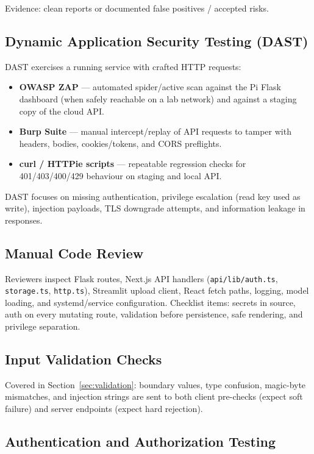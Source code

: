 \documentclass[12pt]{article}
\begin{document}
Evidence: clean reports or documented false positives / accepted risks.

\subsection{Dynamic Application Security Testing (DAST)}

DAST exercises a running service with crafted HTTP requests:

\begin{itemize}
    \item \textbf{OWASP ZAP} --- automated spider/active scan against the Pi
          Flask dashboard (when safely reachable on a lab network) and against a
          staging copy of the cloud API.
    \item \textbf{Burp Suite} --- manual intercept/replay of API requests to
          tamper with headers, bodies, cookies/tokens, and CORS preflights.
    \item \textbf{curl / HTTPie scripts} --- repeatable regression checks for
          401/403/400/429 behaviour on staging and local API.
\end{itemize}

DAST focuses on missing authentication, privilege escalation (read key used as
write), injection payloads, TLS downgrade attempts, and information leakage in
responses.

\subsection{Manual Code Review}

Reviewers inspect Flask routes, Next.js API handlers (\texttt{api/lib/auth.ts},
\texttt{storage.ts}, \texttt{http.ts}), Streamlit upload client, React fetch
paths, logging, model loading, and systemd/service configuration. Checklist
items: secrets in source, auth on every mutating route, validation before
persistence, safe rendering, and privilege separation.

\subsection{Input Validation Checks}

Covered in Section~\ref{sec:validation}: boundary values, type confusion,
magic-byte mismatches, and injection strings are sent to both client pre-checks
(expect soft failure) and server endpoints (expect hard rejection).

\subsection{Authentication and Authorization Testing}
\end{document}

